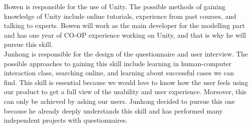 \documentclass[12pt, titlepage]{article}
\begin{document}
Bowen is responsible for the use of Unity. The possible methods of gaining knowledge of Unity include online tutorials, experience from past courses, and talking to experts. Bowen will work as the main developer for the modelling part and has one year of CO-OP experience working on Unity, and that is why he will pursue this skill.\\

Junhong is responsible for the design of the questionnaire and user interview. The possible approaches to gaining this skill include learning in human-computer interaction class, searching online, and learning about successful cases we can find. This skill is essential because we would love to know how the user feels using our product to get a full view of the usability and user experience. Moreover, this can only be achieved by asking our users. Junhong decided to pursue this one because he already deeply understands this skill and has performed many independent projects with questionnaires. 
\end{document}
